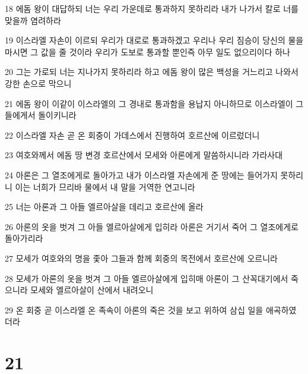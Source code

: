 \par 18 에돔 왕이 대답하되 너는 우리 가운데로 통과하지 못하리라 내가 나가서 칼로 너를 맞을까 염려하라
\par 19 이스라엘 자손이 이르되 우리가 대로로 통과하겠고 우리나 우리 짐승이 당신의 물을 마시면 그 값을 줄 것이라 우리가 도보로 통과할 뿐인즉 아무 일도 없으리이다 하나
\par 20 그는 가로되 너는 지나가지 못하리라 하고 에돔 왕이 많은 백성을 거느리고 나와서 강한 손으로 막으니
\par 21 에돔 왕이 이같이 이스라엘의 그 경내로 통과함을 용납지 아니하므로 이스라엘이 그들에게서 돌이키니라
\par 22 이스라엘 자손 곧 온 회중이 가데스에서 진행하여 호르산에 이르렀더니
\par 23 여호와께서 에돔 땅 변경 호르산에서 모세와 아론에게 말씀하시니라 가라사대
\par 24 아론은 그 열조에게로 돌아가고 내가 이스라엘 자손에게 준 땅에는 들어가지 못하리니 이는 너희가 므리바 물에서 내 말을 거역한 연고니라
\par 25 너는 아론과 그 아들 엘르아살을 데리고 호르산에 올라
\par 26 아론의 옷을 벗겨 그 아들 엘르아살에게 입히라 아론은 거기서 죽어 그 열조에게로 돌아가리라
\par 27 모세가 여호와의 명을 좇아 그들과 함께 회중의 목전에서 호르산에 오르니라
\par 28 모세가 아론의 옷을 벗겨 그 아들 엘르아살에게 입히매 아론이 그 산꼭대기에서 죽으니라 모세와 엘르아살이 산에서 내려오니
\par 29 온 회중 곧 이스라엘 온 족속이 아론의 죽은 것을 보고 위하여 삼십 일을 애곡하였더라

\chapter{21}

